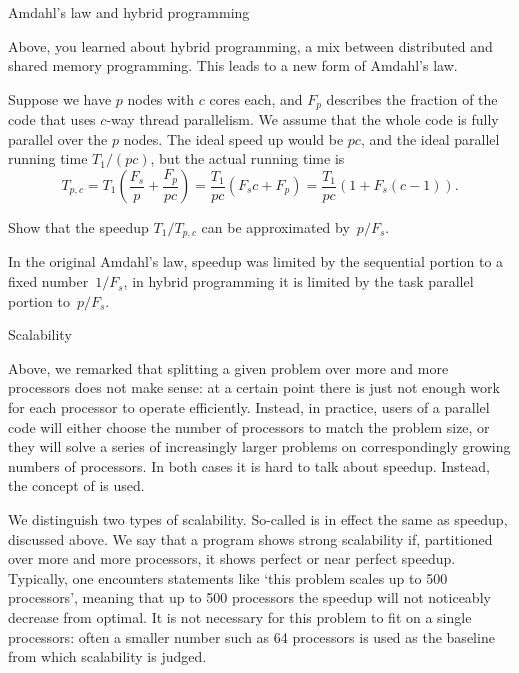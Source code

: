 
 {Amdahl's law and hybrid programming}

Above, you learned about hybrid programming, a mix between distributed
and shared memory programming. This leads to a new form of Amdahl's
law.

Suppose we have $p$ nodes with $c$ cores each, and $F_p$ describes the fraction
of the code that uses $c$-way thread parallelism. We assume that the
whole code is fully parallel over the $p$ nodes.
The ideal speed up would be $p c$, and the ideal parallel running
time $T_1/(pc)$, but the actual running time is 
\[
  T_{p,c} = T_1 \left(\frac {F_s}{p} + \frac{F_p}{p c}\right)
  = \frac{T_1}{pc}\left( F_sc+F_p\right) 
  = \frac{T_1}{pc}\left( 1+ F_s(c-1)\right).
\]
\begin{exercise}
  Show that the speedup $T_1/T_{p,c}$ can be approximated by~$p/F_s$.
\end{exercise}
In the original Amdahl's law, speedup was limited by the sequential
portion to a fixed number~$1/F_s$, in hybrid programming it is limited
by the task parallel portion to~$p/F_s$.


 {Scalability}
\label{sec:scaling}

Above, we remarked that splitting a given problem over more and more
processors does not make sense: at a certain point there is just not
enough work for each processor to operate efficiently. Instead, in
practice, users of a parallel code will either choose the number of
processors to match the problem size, or they will solve a series of
increasingly larger problems on correspondingly growing numbers of
processors. In both cases it is hard to talk about speedup. Instead,
the concept of  is used.

We distinguish two types of scalability. So-called
 is in effect the same as speedup,
discussed above. We say that a program shows strong scalability if,
partitioned over more and more processors, it shows perfect or near
perfect speedup. Typically, one encounters statements like `this
problem scales up to 500 processors', meaning that up to 500
processors the speedup will not noticeably decrease from optimal. It
is not necessary for this problem to fit on a single processors: often
a smaller number such as 64 processors is used as the baseline from
which scalability is judged.

